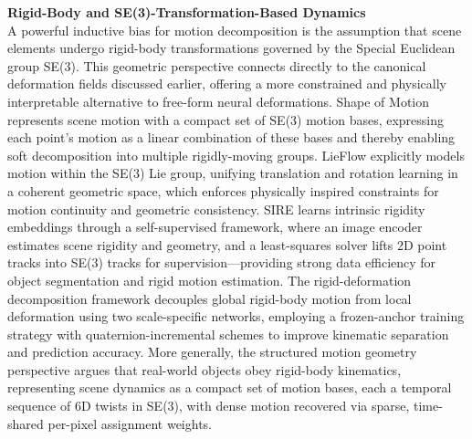 \documentclass[11pt]{article}
\begin{document}
\textbf{Rigid-Body and SE(3)-Transformation-Based Dynamics}\\
A powerful inductive bias for motion decomposition is the assumption that scene elements undergo rigid-body transformations governed by the Special Euclidean group SE(3). This geometric perspective connects directly to the canonical deformation fields discussed earlier, offering a more constrained and physically interpretable alternative to free-form neural deformations. Shape of Motion \cite{ref356} represents scene motion with a compact set of SE(3) motion bases, expressing each point's motion as a linear combination of these bases and thereby enabling soft decomposition into multiple rigidly-moving groups. LieFlow \cite{ref357} explicitly models motion within the SE(3) Lie group, unifying translation and rotation learning in a coherent geometric space, which enforces physically inspired constraints for motion continuity and geometric consistency. SIRE \cite{ref358} learns intrinsic rigidity embeddings through a self-supervised framework, where an image encoder estimates scene rigidity and geometry, and a least-squares solver lifts 2D point tracks into SE(3) tracks for supervision---providing strong data efficiency for object segmentation and rigid motion estimation. The rigid-deformation decomposition framework \cite{ref359} decouples global rigid-body motion from local deformation using two scale-specific networks, employing a frozen-anchor training strategy with quaternion-incremental schemes to improve kinematic separation and prediction accuracy. More generally, the structured motion geometry perspective \cite{ref360} argues that real-world objects obey rigid-body kinematics, representing scene dynamics as a compact set of motion bases, each a temporal sequence of 6D twists in SE(3), with dense motion recovered via sparse, time-shared per-pixel assignment weights.
\end{document}
